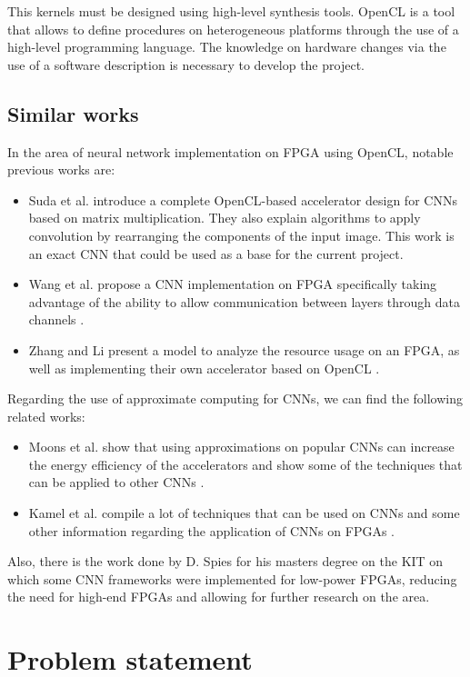 This kernels must be designed using high-level synthesis tools. OpenCL is a tool that allows to define 
procedures on heterogeneous platforms through the 
use of a high-level programming language. The knowledge on hardware changes via the use of a software 
description is necessary to develop the project.

\subsection{Similar works}

In the area of neural network implementation on FPGA using OpenCL, notable previous works are:
\begin{itemize}
    \item Suda et al. introduce a complete OpenCL-based accelerator design for CNNs based on
    matrix multiplication. They also explain algorithms to apply convolution by rearranging
    the components of the input image. This work is an exact CNN that could be used as a base
    for the current project. \cite{suda}
    \item Wang et al. propose a CNN implementation on FPGA specifically taking advantage of 
    the ability to allow communication between layers through data channels \cite{pipecnn}.
    \item Zhang and Li present a model to analyze the resource usage on an FPGA, as well as
    implementing their own accelerator based on OpenCL \cite{zhangcnn}.
\end{itemize}

Regarding the use of approximate computing for CNNs, we can find the following related works:
\begin{itemize}
    \item Moons et al. show that using approximations on popular CNNs can increase the energy
    efficiency of the accelerators and show some of the techniques that can be applied to other
    CNNs \cite{moons}.
    \item Kamel et al. compile a lot of techniques that can be used on CNNs and some other 
    information regarding the application of CNNs on FPGAs \cite{kamel}.
\end{itemize}

Also, there is the work done by D. Spies for his masters degree on the KIT
on which some CNN frameworks were implemented for low-power FPGAs, reducing the need for high-end
FPGAs and allowing for further research on the area.

\section{Problem statement}

